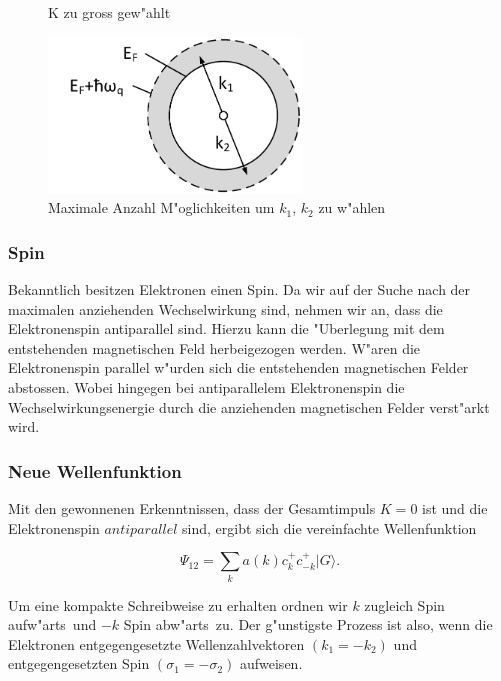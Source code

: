 \begin{refsection}
\begin{figure}
\caption{K zu gross gew"ahlt
\label{supraleitung:kRaum_06}}
\end{figure}
\begin{figure}	
\centering
\includegraphics[width=0.6\textwidth]{supraleitung/Graphics/kGraphic09g.pdf} %
\caption{Maximale Anzahl M"oglichkeiten um $k_1$, $k_2$ zu w"ahlen
\label{supraleitung:kRaum_09}}
\end{figure}

\subsubsection{Spin}
Bekanntlich besitzen Elektronen einen Spin. Da wir auf der Suche nach der maximalen anziehenden Wechselwirkung sind, nehmen wir an, dass die Elektronenspin antiparallel sind. Hierzu kann die "Uberlegung mit dem entstehenden magnetischen Feld herbeigezogen werden. W"aren die Elektronenspin parallel w"urden sich die entstehenden magnetischen Felder abstossen. Wobei hingegen bei antiparallelem Elektronenspin die Wechselwirkungsenergie durch die anziehenden magnetischen Felder verst"arkt wird.

\subsubsection{Neue Wellenfunktion}
Mit den gewonnenen Erkenntnissen, dass der Gesamtimpuls $K=0$ ist und die Elektronenspin $antiparallel$ sind, ergibt sich die vereinfachte Wellenfunktion

\[
\Psi_{12}=\sum \limits_{k} a(k)c^+_{k}c^+_{-k}|G\rangle.
\]

Um eine kompakte Schreibweise zu erhalten ordnen wir $k$ zugleich \glqq Spin aufw"arts\grqq~und $-k$ \glqq Spin abw"arts\grqq~zu.
Der g"unstigste Prozess ist also, wenn die Elektronen entgegengesetzte Wellenzahlvektoren $(k_1 = -k_2)$ und entgegengesetzten Spin $(\sigma_1 = -\sigma_2)$ aufweisen.


\end{refsection}
